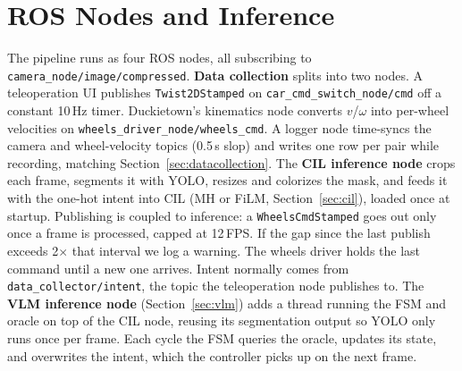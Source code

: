 \section{ROS Nodes and Inference}
\label{sec:inference_optim}

The pipeline runs as four ROS nodes, all subscribing to \texttt{camera\_node/image/compressed}.
\textbf{Data collection} splits into two nodes. 
A teleoperation UI publishes \texttt{Twist2DStamped} on \texttt{car\_cmd\_switch\_node/cmd} off a constant 10\,Hz timer.
Duckietown's kinematics node converts $v$/$\omega$ into per-wheel velocities on \texttt{wheels\_driver\_node/wheels\_cmd}. 
A logger node time-syncs the camera and wheel-velocity topics (0.5\,s slop) and writes one row per pair while recording, matching Section~\ref{sec:datacollection}.
The \textbf{CIL inference node} crops each frame, segments it with YOLO, resizes and colorizes the mask, and feeds it with the one-hot intent into CIL (MH or FiLM, Section~\ref{sec:cil}), loaded once at startup. 
Publishing is coupled to inference: a \texttt{WheelsCmdStamped} goes out only once a frame is processed, capped at 12\,FPS. 
If the gap since the last publish exceeds 2$\times$ that interval we log a warning. The wheels driver holds the last command until a new one arrives. Intent normally comes from \texttt{data\_collector/intent}, the topic the teleoperation node publishes to.
The \textbf{VLM inference node} (Section~\ref{sec:vlm}) adds a thread running the FSM and oracle on top of the CIL node, reusing its segmentation output so YOLO only runs once per frame. 
Each cycle the FSM queries the oracle, updates its state, and overwrites the intent, which the controller picks up on the next frame.
